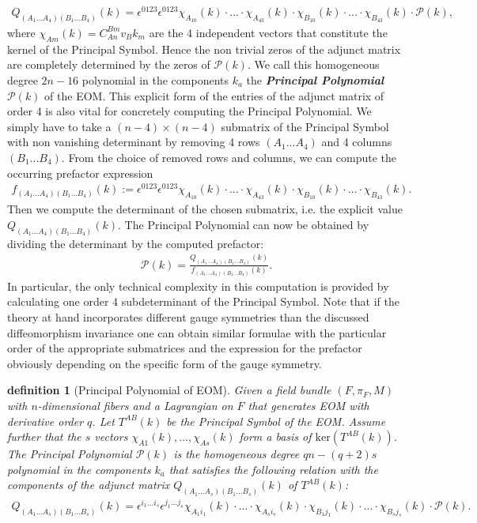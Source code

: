 \documentclass[a4paper,12pt, DIV=14, BCOR=5mm, twoside, headsepline, numbers=noenddot]{scrbook}
\newtheorem{definition}{definition}[section]
\begin{document}
\begin{align}\label{diffeoMinor}
    Q_{(A_1...A_4) (B_1...B_4)}(k) = \epsilon^{0123} \epsilon^{0123} \chi_{A_10}(k) \cdot ... \cdot \chi_{A_43}(k) \cdot \chi_{B_10}(k) \cdot ... \cdot \chi_{B_43}(k) \cdot \mathcal{P}(k),
\end{align}
% 
%
%
%
where $\chi_{Am}(k) = C^{Bm}_{An} v_B k_m$ are the 4 independent vectors that constitute the kernel of the Principal Symbol. Hence the non trivial zeros of the adjunct matrix are completely determined by the zeros of $\mathcal{P}(k)$. We call this homogeneous degree $2n-16$ polynomial in the components $k_a$ the \textit{\textbf{Principal Polynomial}}  $\mathcal{P}(k)$ of the EOM.
This explicit form of the entries of the adjunct matrix of order 4 is also vital for concretely computing the Principal Polynomial. We simply have to take a $(n-4) \times (n-4)$ submatrix of the Principal Symbol with non vanishing determinant by removing 4 rows $(A_1...A_4)$ and 4 columns $(B_1...B_4)$. From the choice of removed rows and columns, we can compute the occurring prefactor expression 
\begin{align}\label{prefacF}
f_{(A_1...A_4)(B_1...B_4)}(k) := \epsilon^{0123} \epsilon^{0123} \chi_{A_10}(k) \cdot ... \cdot \chi_{A_43}(k) \cdot \chi_{B_10}(k) \cdot ... \cdot \chi_{B_43}(k).
\end{align}
Then we compute the determinant of the chosen submatrix, i.e. the explicit value $Q_{(A_1...A_4)(B_1...B_4)}(k)$. The Principal Polynomial can now be obtained by dividing the determinant by the computed prefactor:
\begin{align}
    \mathcal{P}(k) = \frac{Q_{(A_1...A_4)(B_1...B_4)}(k)}{f_{(A_1...A_4)(B_1...B_4)}(k)}.
\end{align}
In particular, the only technical complexity in this computation is provided by calculating one order 4 subdeterminant of the Principal Symbol. 
Note that if the theory at hand incorporates different gauge symmetries than the discussed diffeomorphism invariance one can obtain similar formulae with the particular order of the appropriate submatrices and the expression for the prefactor obviously depending on the specific form of the gauge symmetry.
\begin{definition}[Principal Polynomial of EOM]
Given a field bundle $(F,\pi_F,M)$ with $n$-dimensional fibers and a Lagrangian on $F$ that generates EOM with derivative order $q$. Let  $T^{AB}(k)$ be the Principal Symbol of the EOM. Assume further that the $s$ vectors $\chi_{A1}(k),...,\chi_{As}(k)$ form a basis of $\mathrm{ker}(T^{AB}(k))$. The Principal Polynomial $\mathcal{P}(k)$
is the homogeneous degree $qn - (q+2)s$ polynomial in the components $k_a$ that satisfies the following relation with the components of the adjunct matrix $Q_{(A_1...A_s)(B_1...B_s)}(k)$ of $T^{AB}(k)$:
\begin{align}
   Q_{(A_1...A_s)(B_1...B_s)}(k) = \epsilon^{i_1...i_s} \epsilon^{j_1...j_s} \chi_{A_1i_1}(k)\cdot ... \cdot \chi_{A_si_s}(k) \cdot \chi_{B_1j_1}(k) \cdot ... \cdot \chi_{B_sj_s}(k) \cdot \mathcal{P}(k).
\end{align}
\end{definition}
\end{document}
